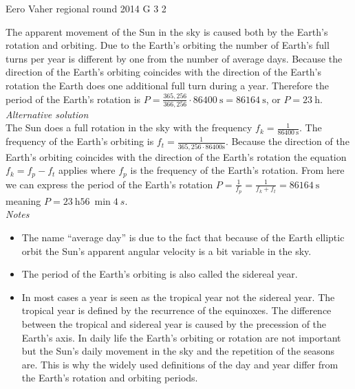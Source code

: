 \documentclass[11pt]{article}
\begin{document}
{Eero Vaher} %
{regional round} %
{2014} %
{G 3} %
{2} %
{

\ifEngSolution
The apparent movement of the Sun in the sky is caused both by the Earth’s rotation and orbiting. Due to the Earth’s orbiting the number of Earth’s full turns per year is different by one from the number of average days. Because the direction of the Earth’s orbiting coincides with the direction of the Earth’s rotation the Earth does one additional full turn during a year. Therefore the period of the Earth’s rotation is $P=\frac{365,256}{366,256} \cdot \SI{86400}{\second}=\SI{86164}{\second}$, or $P=\SI{23}{\hour}$.\\

\emph{Alternative solution}\\
The Sun does a full rotation in the sky with the frequency $f_k=\frac{1}{\SI{86400}{\second}}$. The frequency of the Earth’s orbiting is $f_t=\frac{1}{365,256\cdot86400\text{s}}$. Because the direction of the Earth’s orbiting coincides with the direction of the Earth’s rotation the equation $f_k=f_p-f_t$ applies where $f_p$ is the frequency of the Earth’s rotation. From here we can express the period of the Earth’s rotation $P=\frac{1}{f_p}=\frac{1}{f_k+f_t}=\SI{86164}{\second}$ meaning $P=\SI{23}{\hour} \SI{56}{\min} \SI{4}{s}$. \\

\emph{Notes}\\
\begin{itemize}
\item The name “average day” is due to the fact that because of the Earth elliptic orbit the Sun’s apparent angular velocity is a bit variable in the sky.
\item The period of the Earth’s orbiting is also called the sidereal year.
\item In most cases a year is seen as the tropical year not the sidereal year. The tropical year is defined by the recurrence of the equinoxes. The difference between the tropical and sidereal year is caused by the precession of the Earth’s axis. In daily life the Earth’s orbiting or rotation are not important but the Sun’s daily movement in the sky and the repetition of the seasons are. This is why the widely used definitions of the day and year differ from the Earth’s rotation and orbiting periods.
\end{itemize}
\fi
}
\end{document}
